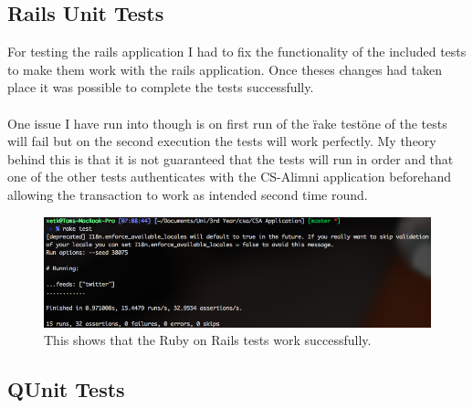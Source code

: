\documentclass{article}
\begin{document}
\subsection{Rails Unit Tests}

For testing the rails application I had to fix the functionality of the included tests to make them work with the rails application. Once theses changes had taken place it was possible to complete the tests successfully.\\
\\
One issue I have run into though is on first run of the \"rake test\" one of the tests will fail but on the second execution the tests will work perfectly. My theory behind this is that it is not guaranteed that the tests will run in order and that one of the other tests authenticates with the CS-Alimni application beforehand allowing the transaction to work as intended second time round.

\begin{figure}[H]
\centering
\includegraphics[width=\textwidth]{railstests}
\caption{This shows that the Ruby on Rails tests work successfully.}
\end{figure}

\subsection{QUnit Tests}
\end{document}
